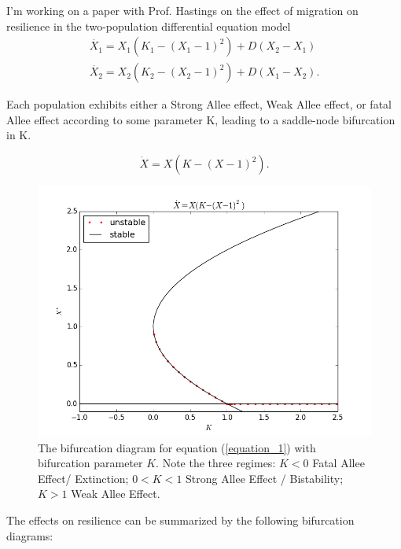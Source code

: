 \documentclass[12pt]{article}
\begin{document}
\rhead{\today}


I'm working on a paper with Prof. Hastings on the effect of migration on resilience in the two-population differential equation model
\begin{align}
\dot{X_1} = X_1 (K_1 - (X_1 - 1)^2) + D( X_2 - X_1) \label{equation_2} \\
\dot{X_2} = X_2 (K_2 - (X_2 - 1)^2) + D( X_1 - X_2). \label{equation_3}
\end{align}


Each population exhibits either a Strong Allee effect, Weak Allee effect, or fatal Allee effect according to some parameter K, leading to a saddle-node bifurcation in K.

\begin{equation}\label{equation_1}
\dot{X} = X ( K - (X-1)^2).
\end{equation}


\begin{figure}[H]\label{bifd_1d}
\centering\includegraphics[scale=0.65]{single_pop_bif_diag_ver3.png}
\caption{The bifurcation diagram for equation (\ref{equation_1}) with bifurcation parameter $K$.  Note the three regimes: $K<0
$ Fatal Allee Effect/ Extinction; $0 < K < 1$ Strong Allee Effect / Bistability; $K > 1$ Weak Allee Effect.}
\end{figure}

The effects on resilience can be summarized by the following bifurcation diagrams:
\end{document}
